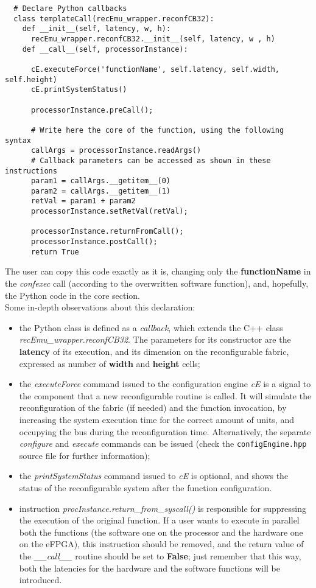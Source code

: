 \scriptsize
\begin{verbatim}
  # Declare Python callbacks
  class templateCall(recEmu_wrapper.reconfCB32):
    def __init__(self, latency, w, h):
      recEmu_wrapper.reconfCB32.__init__(self, latency, w , h)
    def __call__(self, processorInstance):

      cE.executeForce('functionName', self.latency, self.width, self.height)
      cE.printSystemStatus()

      processorInstance.preCall();

      # Write here the core of the function, using the following syntax
      callArgs = processorInstance.readArgs()
      # Callback parameters can be accessed as shown in these instructions
      param1 = callArgs.__getitem__(0)
      param2 = callArgs.__getitem__(1)
      retVal = param1 + param2
      processorInstance.setRetVal(retVal);

      processorInstance.returnFromCall();
      processorInstance.postCall();
      return True
\end{verbatim}
\normalsize
The user can copy this code exactly as it is, changing only the \mbox{\textbf{functionName}} in the \mbox{\textit{confexec}} call (according to the overwritten software function), and, hopefully, the Python code in the core section.\\
\indent Some in-depth observations about this declaration:
\begin{itemize}
  \item the Python class is defined as a \textit{callback}, which extends the C++ class \textit{recEmu\_wrapper.reconfCB32}. The parameters for its constructor are the \textbf{latency} of its execution, and its dimension on the reconfigurable fabric, expressed as number of \textbf{width} and \textbf{height} cells;
  \item the \textit{executeForce} command issued to the configuration engine \textit{cE} is a signal to the component that a new reconfigurable routine is called. It will simulate the reconfiguration of the fabric (if needed) and the function invocation, by increasing the system execution time for the correct amount of units, and occupying the bus during the reconfiguration time. Alternatively, the separate \textit{configure} and \textit{execute} commands can be issued (check the \verb|configEngine.hpp| source file for further information);
  \item the \textit{printSystemStatus} command issued to \textit{cE} is optional, and shows the status of the reconfigurable system after the function configuration.
  \item instruction \textit{procInstance.return\_from\_syscall()} is responsible for suppressing the execution of the original function. If a user wants to execute in parallel both the functions (the software one on the processor and the hardware one on the eFPGA), this instruction should be removed, and the return value of the \textit{\_\_call\_\_} routine should be set to \textbf{False}; just remember that this way, both the latencies for the hardware and the software functions will be introduced.
\end{itemize}

